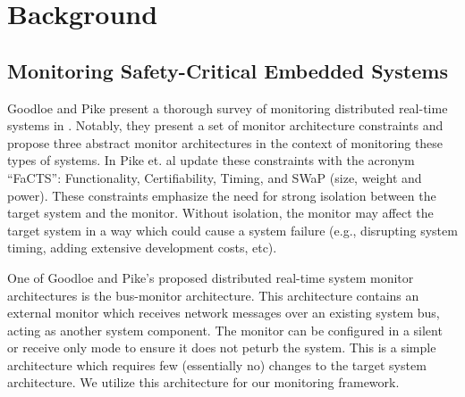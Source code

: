 
\section{Background}

\subsection{Monitoring Safety-Critical Embedded Systems}
\label{sec:bg:sc_monitor}
Goodloe and Pike present a thorough survey of monitoring distributed real-time systems in \cite{Goodloe2010}. Notably, they present a set of monitor architecture constraints and propose three abstract monitor architectures in the context of monitoring these types of systems.
%
In \cite{Pike2011} Pike et. al update these constraints with the acronym ``FaCTS'': Functionality, Certifiability, Timing, and SWaP (size, weight and power). 
These constraints emphasize the need for strong isolation between the target system and the monitor. Without isolation, the monitor may affect the target system in a way which could cause a system failure (e.g., disrupting system timing, adding extensive development costs, etc).



One of Goodloe and Pike's proposed distributed real-time system monitor architectures is the bus-monitor architecture.
This architecture contains an external monitor which receives network messages over an existing system bus, acting as another system component.
The monitor can be configured in a silent or receive only mode to ensure it does not peturb the system. 
This is a simple architecture which requires few (essentially no) changes to the target system architecture. We utilize this architecture for our monitoring framework. 

